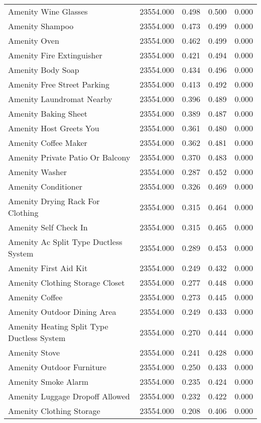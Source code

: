 \begin{tabular}{lllll}
Amenity Wine Glasses & 23554.000 & 0.498 & 0.500 & 0.000 \\
Amenity Shampoo & 23554.000 & 0.473 & 0.499 & 0.000 \\
Amenity Oven & 23554.000 & 0.462 & 0.499 & 0.000 \\
Amenity Fire Extinguisher & 23554.000 & 0.421 & 0.494 & 0.000 \\
Amenity Body Soap & 23554.000 & 0.434 & 0.496 & 0.000 \\
Amenity Free Street Parking & 23554.000 & 0.413 & 0.492 & 0.000 \\
Amenity Laundromat Nearby & 23554.000 & 0.396 & 0.489 & 0.000 \\
Amenity Baking Sheet & 23554.000 & 0.389 & 0.487 & 0.000 \\
Amenity Host Greets You & 23554.000 & 0.361 & 0.480 & 0.000 \\
Amenity Coffee Maker & 23554.000 & 0.362 & 0.481 & 0.000 \\
Amenity Private Patio Or Balcony & 23554.000 & 0.370 & 0.483 & 0.000 \\
Amenity Washer & 23554.000 & 0.287 & 0.452 & 0.000 \\
Amenity Conditioner & 23554.000 & 0.326 & 0.469 & 0.000 \\
Amenity Drying Rack For Clothing & 23554.000 & 0.315 & 0.464 & 0.000 \\
Amenity Self Check In & 23554.000 & 0.315 & 0.465 & 0.000 \\
Amenity Ac   Split Type Ductless System & 23554.000 & 0.289 & 0.453 & 0.000 \\
Amenity First Aid Kit & 23554.000 & 0.249 & 0.432 & 0.000 \\
Amenity Clothing Storage Closet & 23554.000 & 0.277 & 0.448 & 0.000 \\
Amenity Coffee & 23554.000 & 0.273 & 0.445 & 0.000 \\
Amenity Outdoor Dining Area & 23554.000 & 0.249 & 0.433 & 0.000 \\
Amenity Heating   Split Type Ductless System & 23554.000 & 0.270 & 0.444 & 0.000 \\
Amenity Stove & 23554.000 & 0.241 & 0.428 & 0.000 \\
Amenity Outdoor Furniture & 23554.000 & 0.250 & 0.433 & 0.000 \\
Amenity Smoke Alarm & 23554.000 & 0.235 & 0.424 & 0.000 \\
Amenity Luggage Dropoff Allowed & 23554.000 & 0.232 & 0.422 & 0.000 \\
Amenity Clothing Storage & 23554.000 & 0.208 & 0.406 & 0.000 \\

\end{tabular}
